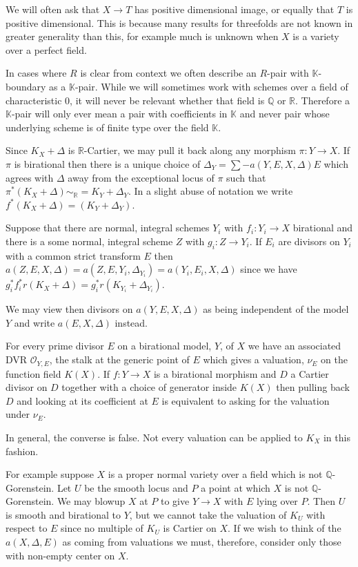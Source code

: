 We will often ask that $X \to T$ has positive dimensional image, or equally that $T$ is positive dimensional. This is because many results for threefolds are not known in greater generality than this, for example much is unknown when $X$ is a variety over a perfect field.

In cases where $R$ is clear from context we often describe an $R$-pair with $\mathbb{K}$-boundary as a $\mathbb{K}$-pair. While we will sometimes work with schemes over a field of characteristic $0$, it will never be relevant whether that field is $\mathbb{Q}$ or $\mathbb{R}$. Therefore a $\mathbb{K}$-pair will only ever mean a pair with coefficients in $\mathbb{K}$ and never pair whose underlying scheme is of finite type over the field $\mathbb{K}$. 

Since $K_{X}+\Delta$ is $\mathbb{R}$-Cartier, we may pull it back along any morphism $\pi\colon  Y \to X$. If $\pi$ is birational then there is a unique choice of $\Delta_{Y}=\sum -a(Y,E,X,\Delta)E$ which agrees with $\Delta$ away from the exceptional locus of $\pi$ such that $\pi^{*}(K_{X}+\Delta)\sim_{\mathbb{R}}=K_{Y}+\Delta_{Y}$. In a slight abuse of notation we write $f^{*}(K_{X}+\Delta)=(K_{Y}+ \Delta_{Y})$.

Suppose that there are normal, integral schemes $Y_{i}$ with $f_{i}:Y_{i} \to X$ birational and there is a some normal, integral scheme $Z$ with $g_{i}:Z\to Y_{i}$. If $E_{i}$ are divisors on $Y_{i}$ with a common strict transform $E$ then $a(Z,E,X,\Delta)=a(Z,E,Y_{i},\Delta_{Y_{i}})=a(Y_{i},E_{i},X,\Delta)$ since we have $g_{i}^{*}f_{i}^{*}r(K_{X}+\Delta)=g_{i}^{*}r(K_{Y_{i}}+\Delta_{Y_{i}})$.

We may view then divisors on $a(Y,E,X,\Delta)$ as being independent of the model $Y$ and write $a(E,X,\Delta)$ instead. 

For every prime divisor $E$ on a birational model, $Y$, of $X$ we have an associated DVR $\mathcal{O}_{Y,E}$, the stalk at the generic point of $E$ which gives a valuation, $\nu_{E}$ on the function field $K(X)$. If $f:Y \to X$ is a birational morphism and $D$ a Cartier divisor on $D$ together with a choice of generator inside $K(X)$ then pulling back $D$ and looking at its coefficient at $E$ is equivalent to asking for the valuation under $\nu_{E}$. 

In general, the converse is false. Not every valuation can be applied to $K_{X}$ in this fashion.

For example suppose $X$ is a proper normal variety over a field which is not $\mathbb{Q}$-Gorenstein. Let $U$ be the smooth locus and $P$ a point at which $X$ is not $\mathbb{Q}$-Gorenstein. We may blowup $X$ at $P$ to give $Y \to X$ with $E$ lying over $P$. Then $U$ is smooth and birational to $Y$, but we cannot take the valuation of $K_{U}$ with respect to $E$ since no multiple of $K_{U}$ is Cartier on $X$. If we wish to think of the $a(X,\Delta,E)$ as coming from valuations we must, therefore, consider only those with non-empty center on $X$. 

